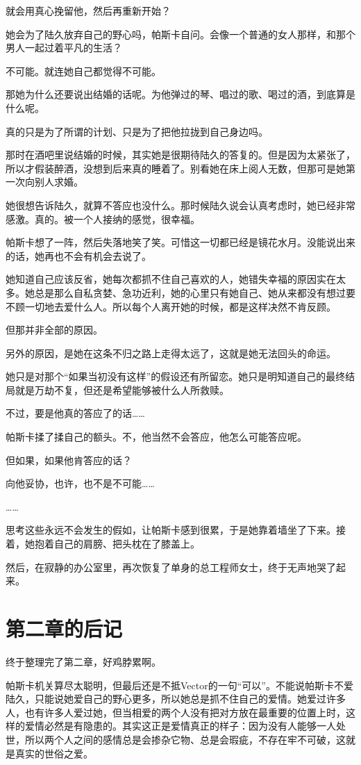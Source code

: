 就会用真心挽留他，然后再重新开始？

她会为了陆久放弃自己的野心吗，帕斯卡自问。会像一个普通的女人那样，和那个男人一起过着平凡的生活？

不可能。就连她自己都觉得不可能。

那她为什么还要说出结婚的话呢。为他弹过的琴、唱过的歌、喝过的酒，到底算是什么呢。

真的只是为了所谓的计划、只是为了把他拉拢到自己身边吗。

那时在酒吧里说结婚的时候，其实她是很期待陆久的答复的。但是因为太紧张了，所以才假装醉酒，没想到后来真的睡着了。别看她在床上阅人无数，但那可是她第一次向别人求婚。

她很想告诉陆久，就算不答应也没什么。那时候陆久说会认真考虑时，她已经非常感激。真的。被一个人接纳的感觉，很幸福。

帕斯卡想了一阵，然后失落地笑了笑。可惜这一切都已经是镜花水月。没能说出来的话，她再也不会有机会去说了。

她知道自己应该反省，她每次都抓不住自己喜欢的人，她错失幸福的原因实在太多。她总是那么自私贪婪、急功近利，她的心里只有她自己、她从来都没有想过要不顾一切地去爱什么人。所以每个人离开她的时候，都是这样决然不肯反顾。

但那并非全部的原因。

另外的原因，是她在这条不归之路上走得太远了，这就是她无法回头的命运。

她只是对那个“如果当初没有这样”的假设还有所留恋。她只是明知道自己的最终结局就是万劫不复，但还是希望能够被什么人所救赎。

不过，要是他真的答应了的话……

帕斯卡揉了揉自己的额头。不，他当然不会答应，他怎么可能答应呢。

但如果，如果他肯答应的话？

向他妥协，也许，也不是不可能……

……

思考这些永远不会发生的假如，让帕斯卡感到很累，于是她靠着墙坐了下来。接着，她抱着自己的肩膀、把头枕在了膝盖上。

然后，在寂静的办公室里，再次恢复了单身的总工程师女士，终于无声地哭了起来。

\section{第二章的后记}
终于整理完了第二章，好鸡脖累啊。

帕斯卡机关算尽太聪明，但最后还是不抵Vector的一句“可以”。不能说帕斯卡不爱陆久，只能说她爱自己的野心更多，所以她总是抓不住自己的爱情。她爱过许多人，也有许多人爱过她，但当相爱的两个人没有把对方放在最重要的位置上时，这样的爱情必然是有隐患的。其实这正是爱情真正的样子：因为没有人能够一人处世，所以两个人之间的感情总是会掺杂它物、总是会瑕疵，不存在牢不可破，这就是真实的世俗之爱。

